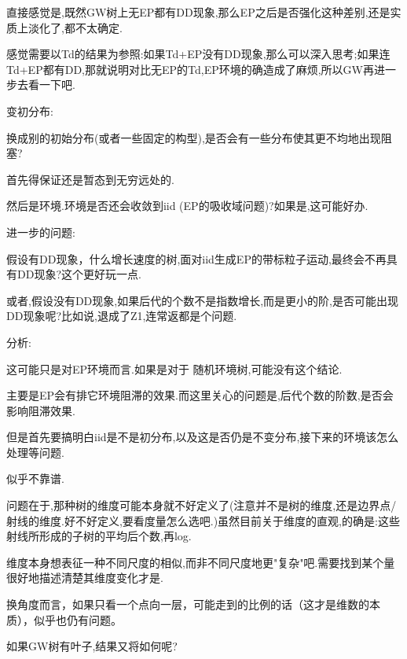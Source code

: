 \documentclass[a4paper,oneside]{ctexbook}
\begin{document}
						直接感觉是,既然GW树上无EP都有DD现象,那么EP之后是否强化这种差别,还是实质上淡化了,都不太确定.

						感觉需要以Td的结果为参照:如果Td+EP没有DD现象,那么可以深入思考;如果连Td+EP都有DD,那就说明对比无EP的Td,EP环境的确造成了麻烦,所以GW再进一步去看一下吧.

				变初分布:

					\begin{que}

						换成别的初始分布(或者一些固定的构型),是否会有一些分布使其更不均地出现阻塞?
					
					\end{que}

					首先得保证还是暂态到无穷远处的.

					然后是环境.环境是否还会收敛到iid (EP的吸收域问题)?如果是,这可能好办.


				进一步的问题:

					\begin{que}[更多或更少的后代是否抵消或产生DD现象]

						假设有DD现象，什么增长速度的树,面对iid生成EP的带标粒子运动,最终会不再具有DD现象?这个更好玩一点.

						或者,假设没有DD现象,如果后代的个数不是指数增长,而是更小的阶,是否可能出现DD现象呢?比如说,退成了Z1,连常返都是个问题.
					
					\end{que}

					分析:

						这可能只是对EP环境而言.如果是对于 随机环境树,可能没有这个结论.

							主要是EP会有排它环境阻滞的效果.而这里关心的问题是,后代个数的阶数,是否会影响阻滞效果.

							但是首先要搞明白iid是不是初分布,以及这是否仍是不变分布,接下来的环境该怎么处理等问题.

						似乎不靠谱.

							问题在于,那种树的维度可能本身就不好定义了(注意并不是树的维度,还是边界点/射线的维度.好不好定义,要看度量怎么选吧.)虽然目前关于维度的直观,的确是:这些射线所形成的子树的平均后个数,再log.

							维度本身想表征一种不同尺度的相似,而非不同尺度地更"复杂"吧.需要找到某个量很好地描述清楚其维度变化才是.

						换角度而言，如果只看一个点向一层，可能走到的比例的话（这才是维数的本质），似乎也仍有问题。

					\begin{que}

						如果GW树有叶子,结果又将如何呢?
					
					\end{que}
\end{document}
